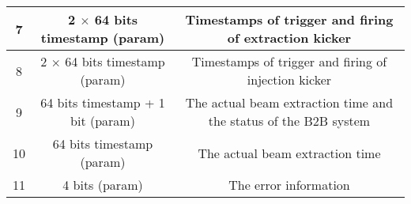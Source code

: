 \begin{landscape}
\begin{table}[!htb]
\begin{center}
\begin{tabular}{ | c | c | c | c | c | c |}
7&	\multicolumn{3}{c|}{2 $\times$ 64 bits timestamp (param)} &\multicolumn{2}{c|}{ Timestamps of trigger and firing of extraction kicker}\\ \hline
8&	\multicolumn{3}{c|}{2 $\times$ 64 bits timestamp (param)} &	\multicolumn{2}{c|}{Timestamps of trigger and firing of injection kicker}\\ \hline

9&	\multicolumn{3}{c|}{64 bits timestamp + 1 bit (param)}&	\multicolumn{2}{c|}{The actual beam extraction time and the status of the B2B system}  \\ \hline

10& \multicolumn{3}{c|}{64 bits timestamp (param)}	&	\multicolumn{2}{c|}{The actual beam extraction time} \\ \hline
11& \multicolumn{3}{c|}{4 bits (param)}	&	\multicolumn{2}{c|}{The error information} \\ \hline

    \end{tabular}
\end{center}
\end{table}
\end{landscape} 